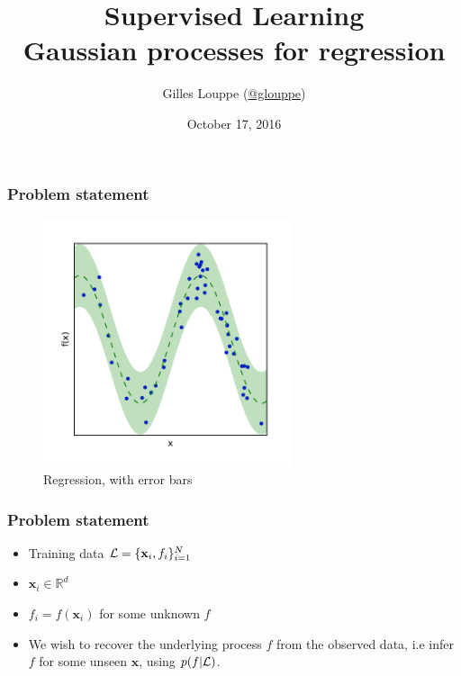 \documentclass{beamer}
\title{{\bf Supervised Learning}\\
Gaussian processes for regression}
\author{
Gilles Louppe (\href{https://twitter.com/glouppe}{@glouppe})
}
\date{October 17, 2016}
\begin{document}
\begin{frame}[plain]
\titlepage
\end{frame}


\begin{frame}
    \frametitle{Problem statement}

    \begin{figure}
    \centering
    \includegraphics[width=0.65\textwidth]{./figures/regression-bars.pdf}\\
    Regression, with error bars
    \end{figure}
\end{frame}


\begin{frame}
    \frametitle{Problem statement}

    \begin{itemize}
        \item Training data ${\cal L} = \{\mathbf{x}_i, f_i\}_{i=1}^N$
        \item $\mathbf{x}_i \in \mathbb{R}^d$
        \item $f_i = f(\mathbf{x}_i)$ for some unknown $f$
        \item We wish to recover the underlying process $f$ from the observed data, i.e infer $f$ for some unseen $\mathbf{x}$, using $p(f|{\cal L})$.
    \end{itemize}
\end{frame}
\end{document}

